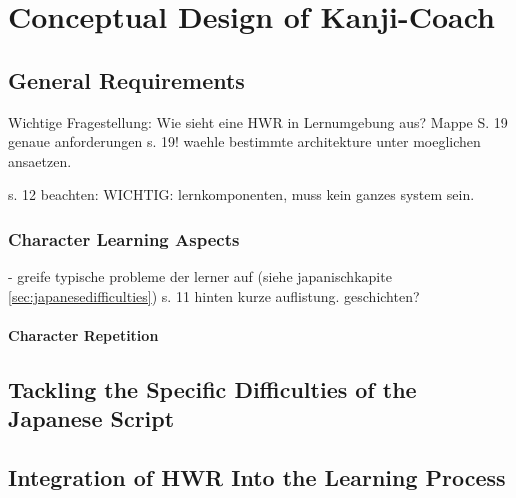 
\chapter{Conceptual Design of Kanji-Coach}
\label{chap:conceptualdesignofkanjicoach}

\section{General Requirements}
\label{sec:concept:generalrequirements}

Wichtige Fragestellung: Wie sieht eine HWR in Lernumgebung aus?
Mappe S. 19
genaue anforderungen s. 19!
waehle bestimmte architekture unter moeglichen ansaetzen.

s. 12 beachten: WICHTIG: lernkomponenten, muss kein ganzes system sein.



\subsection{Character Learning Aspects}
\label{sec:concept:charaterlearningaspects}


- greife typische probleme der lerner auf 
  (siehe japanischkapite \ref{sec:japanesedifficulties})
  s. 11 hinten kurze auflistung. geschichten?

\subsubsection{Character Repetition}
\label{sec:concept:characterrepetition} %


\section{Tackling the Specific Difficulties of the Japanese Script}
\label{sec:concept:tacklingdifficulties}


\section{Integration of HWR Into the Learning Process}
\label{sec:concept:integrationofhwrintolearning}

